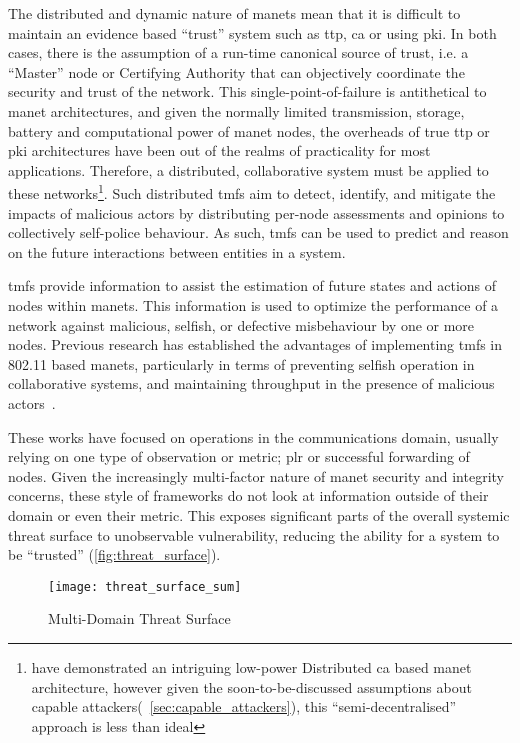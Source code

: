 The distributed and dynamic nature of \glspl{manet} mean that it is difficult to maintain an evidence based ``trust'' system such as \gls{ttp}, \gls{ca} or using \gls{pki}. 
In both cases, there is the assumption of a run-time canonical source of trust, i.e. a ``Master'' node or Certifying Authority that can objectively coordinate the security and trust of the network.
This single-point-of-failure is antithetical to \gls{manet} architectures, and given the normally limited transmission, storage, battery and computational power of \gls{manet} nodes, the overheads of true \gls{ttp} or \gls{pki} architectures have been out of the realms of practicality for most applications.
Therefore, a distributed, collaborative system must be applied to these networks\footnote{\citet{Zouridaki} have demonstrated an intriguing low-power Distributed \gls{ca} based \gls{manet} architecture, however given the soon-to-be-discussed assumptions about capable attackers(~\autoref{sec:capable_attackers}), this ``semi-decentralised'' approach is less than ideal}.
Such distributed \glspl{tmf} aim to detect, identify, and mitigate the impacts of malicious actors by distributing per-node assessments and opinions to collectively self-police behaviour.
As such, \glspl{tmf} can be used to predict and reason on the future interactions between entities in a system.

\glspl{tmf} provide information to assist the estimation of future states and actions of nodes within \glspl{manet}.
This information is used to optimize the performance of a network against malicious, selfish, or defective misbehaviour by one or more nodes.
Previous research has established the advantages of implementing \glspl{tmf} in 802.11 based \glspl{manet}, particularly in terms of preventing selfish operation in collaborative systems, and maintaining throughput in the presence of malicious actors~\cite{Li2007, Buchegger2002}.

These works have focused on operations in the communications domain, usually relying on one type of observation or metric; \gls{plr} or successful forwarding of nodes.
Given the increasingly multi-factor nature of \gls{manet} security and integrity concerns, these style of frameworks do not look at information outside of their domain or even their metric. 
This exposes significant parts of the overall systemic threat surface to unobservable vulnerability, reducing the ability for a system to be ``trusted'' (\autoref{fig:threat_surface}).

\begin{figure}[h!]
	\centering
	\texttt{[image: threat\_surface\_sum]}
	\caption[Multi-Domain Threat Surface]{Multi-Domain Threat Surface}
	\label{fig:threat_surface}
\end{figure}



